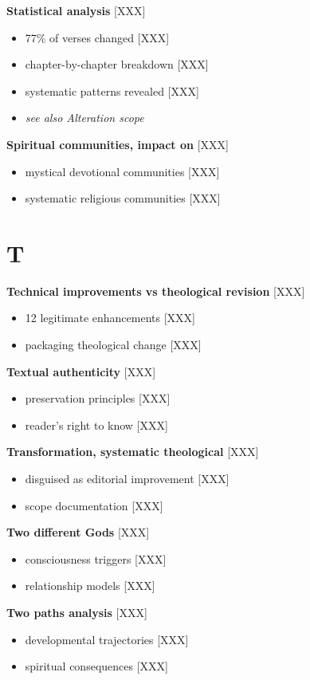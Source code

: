 \documentclass[11pt,twoside]{book}
\begin{document}
\textbf{\textbf{Statistical analysis}} {[}XXX]
\begin{itemize}
\item 77\% of verses changed [XXX]
\item chapter-by-chapter breakdown [XXX]
\item systematic patterns revealed [XXX]
\item \emph{see also Alteration scope}
\end{itemize}

\textbf{\textbf{Spiritual communities, impact on}} {[}XXX]
\begin{itemize}
\item mystical devotional communities [XXX]
\item systematic religious communities [XXX]
\end{itemize}
\section*{T}
\label{sec:org6a1cef4}

\textbf{\textbf{Technical improvements vs theological revision}} {[}XXX]
\begin{itemize}
\item 12 legitimate enhancements [XXX]
\item packaging theological change [XXX]
\end{itemize}

\textbf{\textbf{Textual authenticity}} {[}XXX]
\begin{itemize}
\item preservation principles [XXX]
\item reader's right to know [XXX]
\end{itemize}

\textbf{\textbf{Transformation, systematic theological}} {[}XXX]
\begin{itemize}
\item disguised as editorial improvement [XXX]
\item scope documentation [XXX]
\end{itemize}

\textbf{\textbf{Two different Gods}} {[}XXX]
\begin{itemize}
\item consciousness triggers [XXX]
\item relationship models [XXX]
\end{itemize}

\textbf{\textbf{Two paths analysis}} {[}XXX]
\begin{itemize}
\item developmental trajectories [XXX]
\item spiritual consequences [XXX]
\end{itemize}
\end{document}

